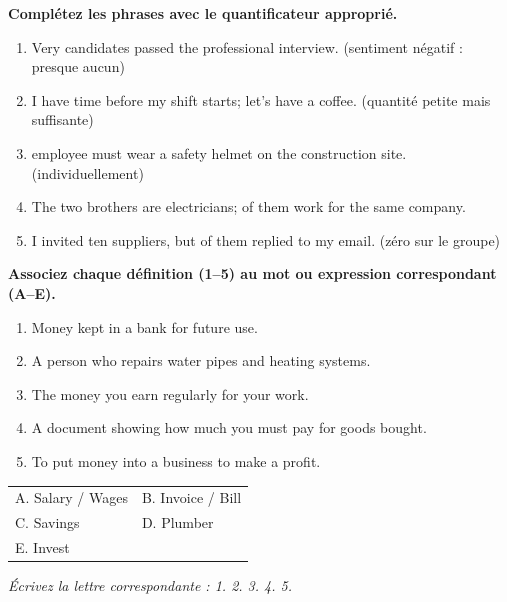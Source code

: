 \documentclass[11pt]{article}
\begin{document}
\begin{exercice}
\textbf{Complétez les phrases avec le quantificateur approprié.}
\begin{enumerate}
    \item Very \underline{\hspace{1.5cm}} candidates passed the professional interview. (sentiment négatif : presque aucun)
    \item I have \underline{\hspace{1.5cm}} time before my shift starts; let's have a coffee. (quantité petite mais suffisante)
    \item \underline{\hspace{1.5cm}} employee must wear a safety helmet on the construction site. (individuellement)
    \item The two brothers are electricians; \underline{\hspace{1.5cm}} of them work for the same company.
    \item I invited ten suppliers, but \underline{\hspace{1.5cm}} of them replied to my email. (zéro sur le groupe)
\end{enumerate}
\end{exercice}

\begin{exercice}
\textbf{Associez chaque définition (1--5) au mot ou expression correspondant (A--E).}
\begin{enumerate}
    \item Money kept in a bank for future use.
    \item A person who repairs water pipes and heating systems.
    \item The money you earn regularly for your work.
    \item A document showing how much you must pay for goods bought.
    \item To put money into a business to make a profit.
\end{enumerate}
\begin{center}
\begin{tabular}{ll}
A. Salary / Wages & B. Invoice / Bill \\
C. Savings & D. Plumber \\
E. Invest &
\end{tabular}
\end{center}
\textit{Écrivez la lettre correspondante : 1.\underline{\hspace{0.5cm}} 2.\underline{\hspace{0.5cm}} 3.\underline{\hspace{0.5cm}} 4.\underline{\hspace{0.5cm}} 5.\underline{\hspace{0.5cm}}}
\end{exercice}
\end{document}
